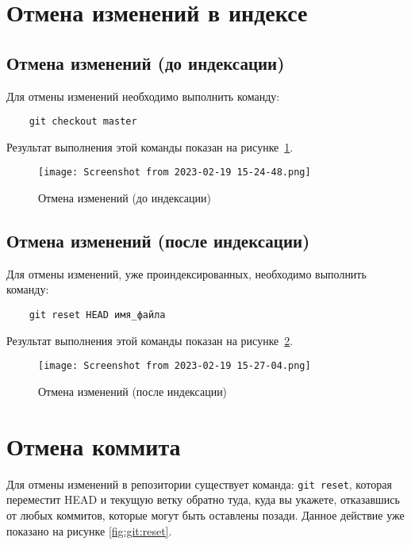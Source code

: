 \section{Отмена изменений в индексе}
\subsection{Отмена изменений (до индексации)}
Для отмены изменений необходимо выполнить команду:
\begin{verbatim}
	git checkout master
\end{verbatim}
Результат выполнения этой команды показан
на рисунке~\ref{fig:git:checkout:b_indx}.
\begin{figure}[h!tp]
	\centering
	\texttt{[image: Screenshot from 2023-02-19 15-24-48.png]}
	\caption{Отмена изменений (до индексации)}
	\label{fig:git:checkout:b_indx}
\end{figure}

\subsection{Отмена изменений (после индексации)}
Для отмены изменений, уже проиндексированных, необходимо выполнить команду:
\begin{verbatim}
	git reset HEAD имя_файла
\end{verbatim}
Результат выполнения этой команды показан на рисунке~\ref{fig:git:restore}.
\begin{figure}[h!tp]
	\centering
	\texttt{[image: Screenshot from 2023-02-19 15-27-04.png]}
	\caption{Отмена изменений (после индексации)}
	\label{fig:git:restore}
\end{figure}

\section{Отмена коммита}
Для отмены изменений в репозитории существует команда: \texttt{git~reset},
которая переместит HEAD и текущую ветку обратно туда, куда вы укажете,
отказавшись от любых коммитов, которые могут быть оставлены позади.
Данное действие уже показано на рисунке \ref{fig:git:reset}.
